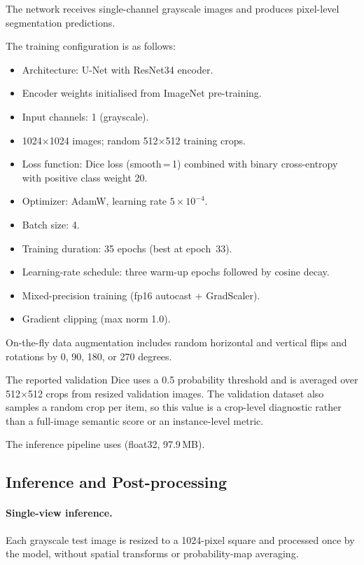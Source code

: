 \documentclass[sigconf,nonacm]{acmart}
\begin{document}
The network receives single-channel grayscale images and
produces pixel-level segmentation predictions.

The training configuration is as follows:

\begin{itemize}
    \setlength{\itemsep}{0.1em}
    \setlength{\topsep}{0.2em}
    \item Architecture: U-Net with ResNet34 encoder.
    \item Encoder weights initialised from ImageNet pre-training.
    \item Input channels: 1 (grayscale).
    \item 1024$\times$1024 images; random 512$\times$512 training crops.
    \item Loss function: Dice loss (smooth\,=\,1) combined with
          binary cross-entropy with positive class weight 20.
    \item Optimizer: AdamW, learning rate $5\times10^{-4}$.
    \item Batch size: 4.
    \item Training duration: 35 epochs (best at epoch~33).
    \item Learning-rate schedule: three warm-up epochs followed
          by cosine decay.
    \item Mixed-precision training (fp16 autocast + GradScaler).
    \item Gradient clipping (max norm 1.0).
\end{itemize}

On-the-fly data augmentation includes random horizontal and vertical
flips and rotations by 0, 90, 180, or 270 degrees.

The reported validation Dice uses a 0.5 probability threshold
and is averaged over 512$\times$512 crops from resized validation
images. The validation dataset also samples a random crop per
item, so this value is a crop-level diagnostic rather than a
full-image semantic score or an instance-level metric.

The inference pipeline uses  (float32,
97.9\,MB).


\subsection{Inference and Post-processing}

\paragraph{Single-view inference.}
Each grayscale test image is resized to a 1024-pixel square and
processed once by the model, without spatial transforms or
probability-map averaging.
\end{document}
